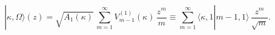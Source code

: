 \begin{equation}
|\kappa,\Omega\rangle(z)=\sqrt{A_1(\kappa)}\,\sum_{m=1}^{\infty}
V_{m-1}^{(1)}(\kappa)\,\frac{z^m}{m}
\equiv\sum_{m=1}^{\infty}\langle\kappa,1|m-1,1\rangle\,
\frac{z^m}{\sqrt{m}}.
\end{equation}

